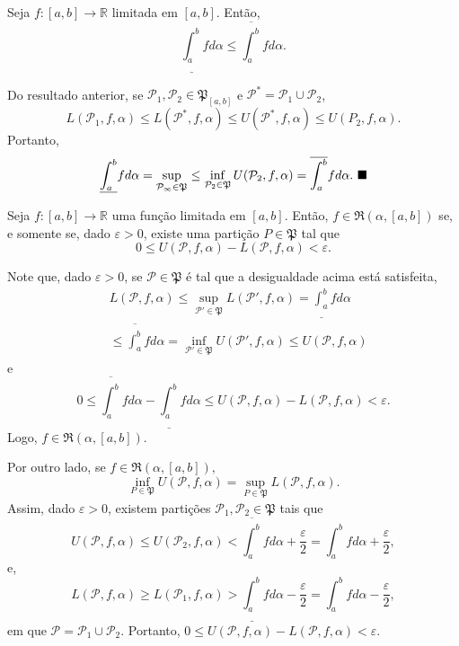 \documentclass[Analysis/analysis_notes.tex]{subfiles}
\begin{document}
\begin{theorem*}
  Seja \(f:[a, b]\rightarrow \mathbb{R}\) limitada em \([a, b]\). Então, 
    \[
      \underline{\int_{a}^{b}} f d\alpha\leq \overline{\int_{a}^{b}}f d\alpha .
    \]
\end{theorem*}
\begin{proof*}
  Do resultado anterior, se \(\mathcal{P}_{1}, \mathcal{P}_{2}\in \mathfrak{P}_{[a, b]}\) e \(\mathcal{P}^{*} = \mathcal{P}_{1}\cup \mathcal{P}_{2}\), 
    \[
      L(\mathcal{P}_{1}, f, \alpha )\leq L(\mathcal{P}^{*}, f, \alpha )\leq U(\mathcal{P}^{*}, f, \alpha )\leq U(P_{2}, f, \alpha ).
    \]
  Portanto, 
    \[
      \underline{\int_{a}^{b}}f d\alpha =\sup_{\mathcal{P_{1}}\in \mathfrak{P}}\leq \inf_{\mathcal{P}_{2}\in \mathfrak{P}} U(\mathcal{P}_{2}, f, \alpha ) = \overline{\int_{a}^{b}}f d\alpha .\text{ $\blacksquare$}
    \]
\end{proof*}
\begin{crl*}
  Seja \(f:[a, b]\rightarrow \mathbb{R}\) uma fun\c cão limitada em \([a, b].\) Então, \(f\in \mathfrak{R}(\alpha , [a, b])\) se, e somente se, 
  dado \(\varepsilon >0\), existe uma parti\c cão \(P\in \mathfrak{P}\) tal que 
    \[
      0\leq U(\mathcal{P}, f, \alpha ) - L(\mathcal{P}, f, \alpha ) <\varepsilon .
    \]
\end{crl*}
\begin{proof*}
  Note que, dado \(\varepsilon  >0\), se \(\mathcal{P}\in \mathfrak{P}\) é tal que a desigualdade acima está satisfeita,
 \begin{align*}
   &L(\mathcal{P}, f, \alpha )\leq \sup_{\mathcal{P}'\in \mathfrak{P}}L(\mathcal{P}', f, \alpha ) = \underline{\int_{a}^{b}}f d\alpha \\
   &\leq \overline{\int_{a}^{b}}f d\alpha = \inf_{\mathcal{P}'\in \mathfrak{P}}U(\mathcal{P}', f, \alpha )\leq U(\mathcal{P}, f, \alpha )
 \end{align*}
 e 
   \[
     0\leq \overline{\int_{a}^{b}}f d\alpha  - \underline{\int_{a}^{b}}f d\alpha\leq U(\mathcal{P}, f, \alpha ) - L(\mathcal{P}, f,\alpha ) <\varepsilon .
   \]
  Logo, \(f\in \mathfrak{R}(\alpha, [a,b])\).

  Por outro lado, se \(f\in \mathfrak{R}(\alpha , [a,b]),\) 
    \[
      \inf_{P\in \mathfrak{P}}U(\mathcal{P}, f, \alpha ) = \sup_{P\in \mathfrak{P}}L(\mathcal{P}, f, \alpha ).
    \]
  Assim, dado \(\varepsilon >0\), existem parti\c cões \(\mathcal{P}_{1}, \mathcal{P}_{2}\in \mathfrak{P}\) tais que 
    \[
      U(\mathcal{P}, f, \alpha )\leq U(\mathcal{P}_{2}, f, \alpha ) < \overline{\int_{a}^{b}}f d\alpha +\frac{\varepsilon }{2} = \int_{a}^{b} f d\alpha  + \frac{\varepsilon }{2},
    \]
  e, 
    \[
      L(\mathcal{P}, f, \alpha )\geq L(\mathcal{P}_{1}, f, \alpha ) > \underline{\int_{a}^{b}} f d\alpha - \frac{\varepsilon }{2} = \int_{a}^{b}f d\alpha - \frac{\varepsilon }{2},
    \]
  em que \(\mathcal{P} = \mathcal{P}_{1}\cup \mathcal{P}_{2}.\) Portanto, \(0\leq U(\mathcal{P}, f, \alpha ) - L(\mathcal{P}, f, \alpha ) < \varepsilon .\) \qedsymbol
\end{proof*} 
\end{document}
